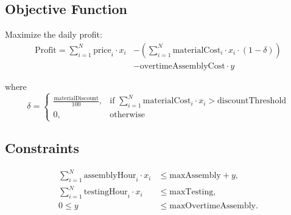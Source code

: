 \documentclass{article}
\begin{document}
\subsection*{Objective Function}
Maximize the daily profit:
\begin{align*}
\text{Profit} = \sum_{i=1}^{N} \text{price}_i \cdot x_i 
& - \left(\sum_{i=1}^{N} \text{materialCost}_i \cdot x_i \cdot (1 - \delta) \right) \\
& - \text{overtimeAssemblyCost} \cdot y
\end{align*}

where 
\[
\delta = 
\begin{cases} 
\frac{\text{materialDiscount}}{100}, & \text{if } \sum_{i=1}^{N} \text{materialCost}_i \cdot x_i > \text{discountThreshold} \\
0, & \text{otherwise}
\end{cases}
\]

\subsection*{Constraints}
\begin{align*}
\sum_{i=1}^{N} \text{assemblyHour}_i \cdot x_i & \leq \text{maxAssembly} + y, \\
\sum_{i=1}^{N} \text{testingHour}_i \cdot x_i & \leq \text{maxTesting}, \\
0 \leq y & \leq \text{maxOvertimeAssembly}.
\end{align*}
\end{document}
